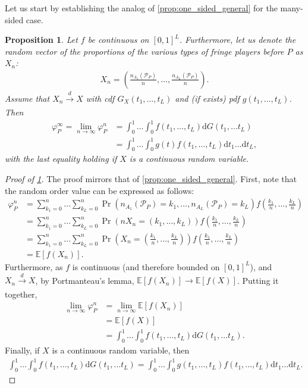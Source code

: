 \documentclass[a4paper]{article}
\newtheorem{proposition}{Proposition}
\newcommand{\dt}{\mathrm{d}t}
\newcommand{\dG}{\mathrm{d}G}
\newcommand{\E}{\mathbb{E}}
\begin{document}
Let us start by establishing the analog of \cref{prop:one_sided_general} for the many-sided case.
\begin{proposition}
    \label{prop:many_sided_general}
    Let $f$ be continuous on $[0, 1]^L$. Furthermore, let us denote the random vector of the proportions of the various types of fringe players before $P$ as $X_n$:
    \begin{align*}
        X_n = \left( \frac{n_{A_1}(\mathcal{P}_P)}{n}, \dots, \frac{n_{A_L}(\mathcal{P}_P)}{n} \right).
    \end{align*}
    Assume that $X_n \xrightarrow[]{d} X$ with cdf $G_X(t_1, \dots, t_L)$ and (if exists) pdf $g(t_1, \dots, t_L)$.
    Then
    \begin{align*}
        \varphi_P^\infty = \lim_{n \to \infty} \varphi_P^n &= \int_0^1 \dots \int_0^1 f(t_1, \dots, t_L) \dG(t_1, \dots t_L) \\
        &= \int_0^1\dots \int_0^1 g(t) f(t_1, \dots, t_L) \dt_1 \dots \dt_L,
    \end{align*}
    with the last equality holding if $X$ is a continuous random variable.
\end{proposition}

\begin{proof}[Proof of \cref{prop:many_sided_general}]
    The proof mirrors that of \cref{prop:one_sided_general}.
    First, note that the random order value can be expressed as follows:
    \begin{align*}
        \varphi_P^n &= \sum_{k_1=0}^n \dots \sum_{k_L=0}^n \Pr(n_{A_1}(\mathcal{P}_P) = k_1, \dots, n_{A_L}(\mathcal{P}_P) = k_L) f\left(\frac{k_1}{n}, \dots, \frac{k_L}{n}\right) \\
        &= \sum_{k_1=0}^n \dots \sum_{k_L=0}^n \Pr(n X_n = (k_1, \dots, k_L)) f\left(\frac{k_1}{n}, \dots, \frac{k_L}{n}\right) \\
        &= \sum_{k_1=0}^n \dots \sum_{k_L=0}^n \Pr \left( X_n = \left(\frac{k_1}{n}, \dots, \frac{k_L}{n}\right) \right) f \left(\frac{k_1}{n}, \dots, \frac{k_L}{n}\right) \\
        &= \E[f(X_n)].
    \end{align*}
    Furthermore, as $f$ is continuous (and therefore bounded on $[0, 1]^L$), and $X_n \xrightarrow[]{d} X$, by Portmanteau's lemma, $\E[f(X_n)] \to \E[f(X)]$.
    Putting it together,
    \begin{align*}
        \lim_{n \to \infty} \varphi_P^n &= \lim_{n \to \infty} \E[f(X_n)] \\
        &= \E[f(X)] \\
        &= \int_0^1 \dots \int_0^1 f(t_1, \dots, t_L) \dG(t_1, \dots t_L).
    \end{align*}
    Finally, if $X$ is a continuous random variable, then
    \begin{align*}
        \int_0^1 \dots \int_0^1 f(t_1, \dots, t_L) \dG(t_1, \dots t_L) = \int_0^1\dots \int_0^1 g(t_1, \dots, t_L) f(t_1, \dots, t_L) \dt_1 \dots \dt_L.
    \end{align*}
\end{proof}
\end{document}
